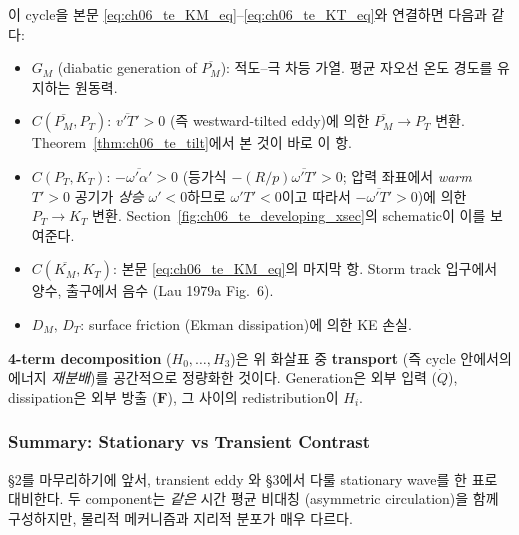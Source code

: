 \begin{hisublock}
이 cycle을 본문 \eqref{eq:ch06_te_KM_eq}--\eqref{eq:ch06_te_KT_eq}와
연결하면 다음과 같다:
\begin{itemize}
  \item $G_M$ (diabatic generation of $\overline{P_M}$): 적도--극 차등 가열.
        평균 자오선 온도 경도를 유지하는 원동력.
  \item $C(\overline{P_M},P_T)$: $\overline{v'T'}>0$
        (즉 westward-tilted eddy)에 의한 $\overline{P_M}\to P_T$ 변환.
        Theorem~\ref{thm:ch06_te_tilt}에서 본 것이 바로 이 항.
  \item $C(P_T,K_T)$: $-\overline{\omega'\alpha'}>0$
        (등가식 $-(R/p)\overline{\omega'T'}>0$;
        압력 좌표에서 \emph{warm} $T'>0$ 공기가 \emph{상승} $\omega'<0$하므로
        $\omega'T'<0$이고 따라서 $-\overline{\omega'T'}>0$)에 의한
        $P_T\to K_T$ 변환.
        Section~\ref{fig:ch06_te_developing_xsec}의 schematic이 이를 보여준다.
  \item $C(\overline{K_M},K_T)$: 본문 \eqref{eq:ch06_te_KM_eq}의 마지막 항.
        Storm track 입구에서 양수, 출구에서 음수 (Lau 1979a Fig.~6).
  \item $D_M,\,D_T$: surface friction (Ekman dissipation)에 의한 KE 손실.
\end{itemize}
\textbf{4-term decomposition} ($H_0,\dots,H_3$)은 위 화살표 중
\textbf{transport} (즉 cycle 안에서의 에너지 \textit{재분배})를
공간적으로 정량화한 것이다.  Generation은 외부 입력 ($\dot{Q}$),
dissipation은 외부 방출 ($\mathbf{F}$), 그 사이의 redistribution이 $H_i$.
\end{hisublock}



\subsubsection{Summary: Stationary vs Transient Contrast}

\S2를 마무리하기에 앞서, transient eddy 와 \S3에서 다룰 stationary wave를
한 표로 대비한다.  두 component는 \textit{같은} 시간 평균 비대칭 (asymmetric
circulation)을 함께 구성하지만, 물리적 메커니즘과 지리적 분포가 매우 다르다.

